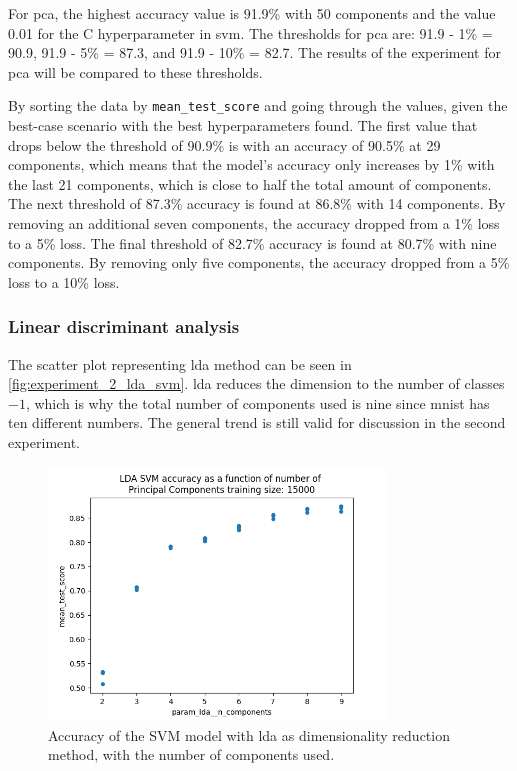 For \gls{pca}, the highest accuracy value is 91.9\% with 50 components and the value 0.01 for the C hyperparameter in \gls{svm}. The thresholds for \gls{pca} are: 91.9 - 1\% = 90.9, 91.9 - 5\% = 87.3, and 91.9 - 10\% = 82.7. The results of the experiment for \gls{pca} will be compared to these thresholds.

By sorting the data by \texttt{mean\_test\_score} and going through the values, given the best-case scenario with the best hyperparameters found. The first value that drops below the threshold of 90.9\% is with an accuracy of 90.5\% at 29 components, which means that the model's accuracy only increases by 1\% with the last 21 components, which is close to half the total amount of components.
The next threshold of 87.3\% accuracy is found at 86.8\% with 14 components. By removing an additional seven components, the accuracy dropped from a 1\% loss to a 5\% loss.
The final threshold of 82.7\% accuracy is found at 80.7\% with nine components. By removing only five components, the accuracy dropped from a 5\% loss to a 10\% loss.

\subsubsection{Linear discriminant analysis}\label{subsubsec:experiment_2_lda}
The scatter plot representing \gls{lda} method can be seen in \autoref{fig:experiment_2_lda_svm}. \gls{lda} reduces the dimension to the number of classes $-1$, which is why the total number of components used is nine since \gls{mnist} has ten different numbers. The general trend is still valid for discussion in the second experiment.


\begin{figure}[htb!]
    \centering
    \includegraphics[width=0.8\textwidth]{figures/experiment_two/lda_svm_15000.png}
    \caption{Accuracy of the SVM model with \gls{lda} as dimensionality reduction method, with the number of components used.}
    \label{fig:experiment_2_lda_svm}
\end{figure}

